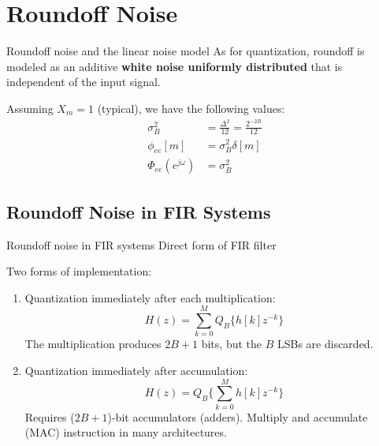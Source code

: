 \documentclass[10pt, aspectratio=169, handout]{beamer}
\begin{document}
\section{Roundoff Noise}
\begin{frame}{Roundoff noise and the linear noise model}
As for quantization, roundoff is modeled as an additive \textbf{white noise uniformly distributed} that is independent of the input signal. 

\begin{center}
\resizebox{0.5\textwidth}{!}{}
\end{center}

Assuming $X_m = 1$ (typical), we have the following values:
\begin{align*}
\sigma_B^2 &= \frac{\Delta^2}{12} =  \frac{2^{-2B}}{12}\tag{average power} \\
\phi_{ee}[m] &= \sigma_B^2\delta[m] \tag{autocorrelation function} \\
\Phi_{ee}(e^{j\omega}) &= \sigma_B^2 \tag{PSD}
\end{align*}
\end{frame}

\subsection{Roundoff Noise in FIR Systems}
\begin{frame}{Roundoff noise in FIR systems}
	Direct form of FIR filter
	\begin{center}
		\resizebox{0.55\textwidth}{!}{}
	\end{center}
	\vspace{-0.4cm}
	Two forms of implementation:
	\begin{enumerate}
		\item Quantization immediately after each multiplication:
		\begin{equation*}
		H(z) = \sum_{k = 0}^M Q_B\{h[k]z^{-k}\}
		\end{equation*}
		The multiplication produces $2B+1$ bits, but the $B$ LSBs are discarded.
		\item Quantization immediately after accumulation:
		\begin{equation*}
		H(z) = Q_B\bigg\lbrace\sum_{k = 0}^M h[k]z^{-k}\bigg\rbrace
		\end{equation*}
		Requires ($2B+1$)-bit accumulators (adders). Multiply and accumulate (MAC) instruction in many architectures.
	\end{enumerate}	
\end{frame}
\end{document}
